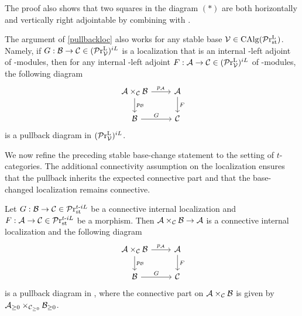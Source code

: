 \documentclass[a4paper,10pt, oneside]{amsart}
\begin{document}
	
	\begin{rem}
		The proof also shows that two squares in the diagram $(*)$ are both horizontally and vertically right adjointable by combining with \cite[Proposition 1.62]{ramzi2024dualizable}.
	\end{rem}
	
	\begin{rem}
	The argument of \cref{pullbackloc} also works for any stable base $\mathcal{V}\in \operatorname{CAlg}(\mathcal{P}\mathrm{r}_{\mathrm{st}}^\mathrm{L})$. Namely, if $G:\mathcal{B}\to\mathcal{C}\in (\mathcal{P}\mathrm{r}^\mathrm{L}_{\mathcal{V}})^{iL}$ is a localization that is an internal \mcv-left adjoint of \mcv-modules, then for any internal \mcv-left adjoint $F:\mathcal{A} \to\mathcal{C} \in (\mathcal{P}\mathrm{r}^\mathrm{L}_{\mathcal{V}})^{iL}$ of \mcv-modules, the following diagram 
	$$
	\begin{tikzcd}
		\mca\times_{\mcc}\mcb \arrow[d, "p_{\mcb}"] \arrow[r, "p_{\mca}"] & \mca \arrow[d, "F"] \\
		\mcb \arrow[r, "G"]                                               & \mcc               
	\end{tikzcd}
	$$ 
	is a pullback diagram in $(\mathcal{P}\mathrm{r}^\mathrm{L}_{\mathcal{V}})^{iL}$.
	\end{rem}
	We now refine the preceding stable base-change statement to the setting of $t$-categories. The additional connectivity assumption on the localization ensures that the pullback inherits the expected connective part and that the base-changed localization remains connective.
	\begin{prop}\label{pullbackt}
		Let $G:\mathcal{B}\to\mathcal{C}\in \mathcal{P}\mathrm{r}^{t\text{-}iL}_{\mathrm{st}}$ be a connective internal localization and $F:\mathcal{A} \to\mathcal{C} \in\mathcal{P}\mathrm{r}^{t\text{-}iL}_{\mathrm{st}}$ be a morphism. Then $\mathcal{A}\times_{\mathcal{C}}\mathcal{B}\to \mathcal{A}$ is a connective internal localization and the following diagram 
		$$
		\begin{tikzcd}
			\mca\times_{\mcc}\mcb \arrow[d, "p_{\mcb}"] \arrow[r, "p_{\mca}"] & \mca \arrow[d, "F"] \\
			\mcb \arrow[r, "G"]                                               & \mcc               
		\end{tikzcd}
		$$ 
		is a pullback diagram in \prtil, where the connective part on	$\mathcal{A}\times_{\mathcal{C}}\mathcal{B}$ is given by $\mathcal{A}_{\geq0}\times_{\mathcal{C}_{\geq0}}\mathcal{B}_{\geq0}$. 
	\end{prop}
\end{document}
